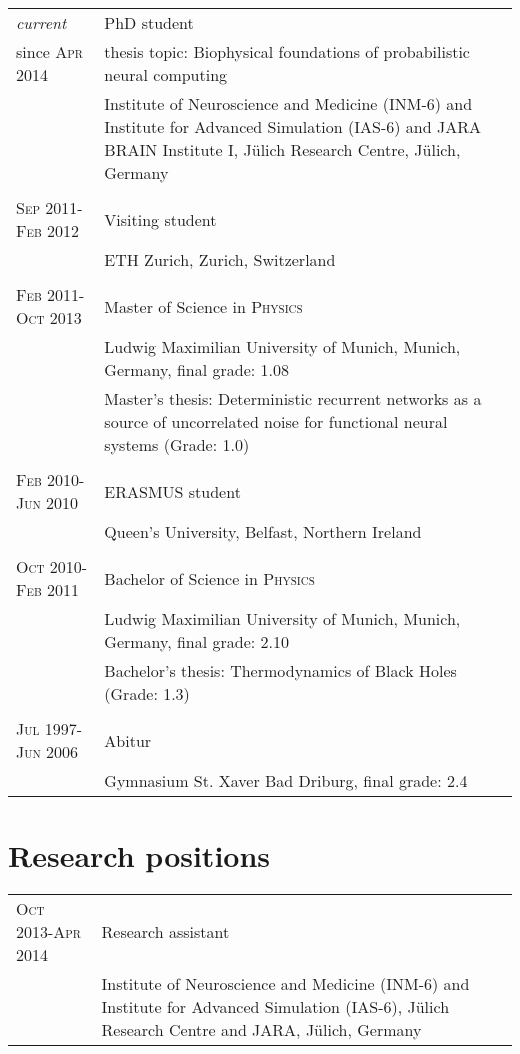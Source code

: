 \documentclass[a4paper,10pt]{article}
\begin{document}
\begin{tabular}{>{\hfill}p{3.15cm}|p{10.4cm}}
  \emph{current} & PhD student \\
  since \textsc{Apr 2014}& \footnotesize thesis topic: Biophysical foundations of probabilistic neural computing \\
  & \footnotesize Institute of Neuroscience and Medicine (INM-6) and Institute for Advanced Simulation (IAS-6) and JARA BRAIN Institute I, J\"ulich Research Centre, J\"ulich, Germany \\
  \multicolumn{2}{c}{} \\
  \textsc{Sep} 2011-\textsc{Feb} 2012 & Visiting student \\
  & \footnotesize{ETH Zurich, Zurich, Switzerland} \\
  \multicolumn{2}{c}{} \\
  \textsc{Feb} 2011-\textsc{Oct} 2013 & Master of Science in \textsc{Physics} \\
  & \footnotesize Ludwig Maximilian University of Munich, Munich, Germany, final grade: 1.08 \\
  & \footnotesize Master's thesis: Deterministic recurrent networks as
  a source of uncorrelated noise for
  functional neural systems (Grade: 1.0) \\
  \multicolumn{2}{c}{} \\
  \textsc{Feb} 2010-\textsc{Jun} 2010 & ERASMUS student \\
  & \footnotesize Queen's University, Belfast, Northern Ireland \\
  \multicolumn{2}{c}{} \\
  \textsc{Oct} 2010-\textsc{Feb} 2011 & Bachelor of Science in \textsc{Physics} \\
  & \footnotesize Ludwig Maximilian University of Munich, Munich, Germany, final grade: 2.10 \\
  & \footnotesize Bachelor's thesis: Thermodynamics of Black Holes (Grade: 1.3) \\
  \multicolumn{2}{c}{} \\
  \textsc{Jul} 1997-\textsc{Jun} 2006 & Abitur \\
  & \footnotesize Gymnasium St. Xaver Bad Driburg, final grade: 2.4
\end{tabular}

\section{Research positions}
\begin{tabular}{>{\hfill}p{3.15cm}|p{10.4cm}}
\textsc{Oct} 2013-\textsc{Apr} 2014 & Research assistant \\
& \footnotesize Institute of Neuroscience and Medicine (INM-6) and Institute for Advanced Simulation (IAS-6), J\"ulich Research Centre and JARA, J\"ulich, Germany\\
\end{tabular}
\end{document}
